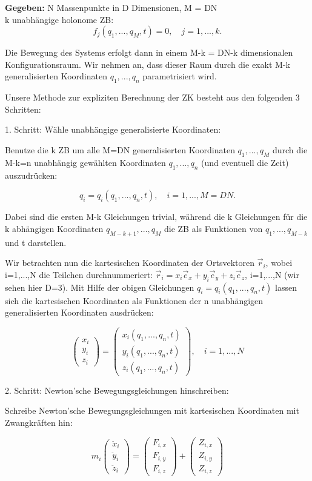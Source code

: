 \documentclass[10pt, letterpaper]{article}
\begin{document}
\textbf{Gegeben:} N Massenpunkte in D Dimensionen, M = DN\\
\indent k unabhängige holonome ZB:
\[f_j(q_1,...,q_M,t) = 0, \quad j=1,...,k.\]

Die Bewegung des Systems erfolgt dann in einem M-k = DN-k dimensionalen Konfigurationsraum. Wir nehmen an, dass dieser Raum durch die exakt M-k generalisierten Koordinaten $q_1,...,q_n$ parametrisiert wird.

Unsere Methode zur expliziten Berechnung der ZK besteht aus den folgenden 3 Schritten:


1. Schritt: Wähle unabhängige generalisierte Koordinaten:

Benutze die k ZB um alle M=DN generalisierten Koordinaten $q_1,...,q_M$ durch die M-k=n unabhängig gewählten Koordinaten $q_1,...,q_n$ (und eventuell die Zeit) auszudrücken:

\[q_i = q_i(q_1,...,q_n,t), \quad i=1,...,M=DN.\]

Dabei sind die ersten M-k Gleichungen trivial, während die k Gleichungen für die k abhängigen Koordinaten $q_{M-k+1},...,q_M$ die ZB als Funktionen von $q_1,...,q_{M-k}$ und t darstellen.

Wir betrachten nun die kartesischen Koordinaten der Ortsvektoren $\vec{r}_i$, wobei i=1,...,N die Teilchen durchnummeriert: $\vec{r}_i = x_i \vec{e}_x + y_i \vec{e}_y + z_i \vec{e}_z$, i=1,...,N (wir sehen hier D=3). Mit Hilfe der obigen Gleichungen $q_i = q_i(q_1,...,q_n,t)$ lassen sich die kartesischen Koordinaten als Funktionen der n unabhängigen generalisierten Koordinaten ausdrücken:

\[\begin{pmatrix} x_i \\ y_i \\ z_i \end{pmatrix} = \begin{pmatrix} x_i(q_1,...,q_n,t) \\ y_i(q_1,...,q_n,t) \\ z_i(q_1,...,q_n,t) \end{pmatrix}, \quad i=1,...,N\]


2. Schritt: Newton'sche Bewegungsgleichungen hinschreiben:

Schreibe Newton'sche Bewegungsgleichungen mit kartesischen Koordinaten mit Zwangkräften hin:

\[m_i\begin{pmatrix} \ddot{x}_i \\ \ddot{y}_i \\ \ddot{z}_i \end{pmatrix} = \begin{pmatrix} F_{i,x} \\ F_{i,y} \\ F_{i,z} \end{pmatrix} + \begin{pmatrix} Z_{i,x} \\ Z_{i,y} \\ Z_{i,z} \end{pmatrix}\]
\end{document}
